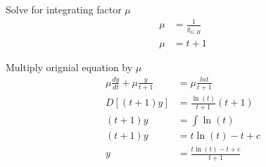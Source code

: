 \documentclass[12pt, letterpaper]{article}
\begin{document}
Solve for integrating factor $\mu$
\begin{align*}
\mu &= \frac{1}{y_{G,H}} \\
\mu &= t+1
\end{align*}


Multiply orignial equation by $\mu$
\begin{align*}
\mu \frac{dy}{dt} + \mu \frac{y}{t+1} &= \mu \frac{lnt}{t+1} \\
D[(t+1)y] &= \frac{\ln(t)}{t+1}(t+1) \\
(t+1)y &= \int \ln(t) \\
(t+1)y &= t\ln(t) - t + c \\
y &= \frac{t\ln(t) - t + c}{t+1}
\end{align*}
\end{document}
